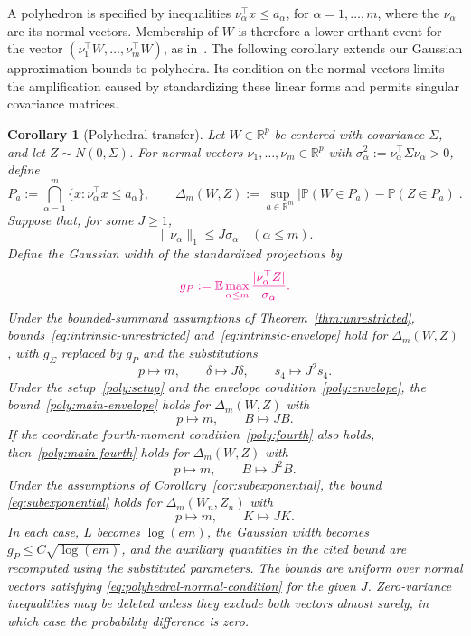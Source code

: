 \documentclass[11pt,letterpaper]{article}
\newenvironment{recovered}{}{}
\newcommand{\vSix}[1]{{\color{magenta}#1}}
\newtheorem{corollary}{Corollary}
\theoremstyle{remark}
\newcommand{\E}{\mathbb E}
\newcommand{\Pp}{\mathbb P}
\newcommand{\R}{\mathbb R}
\begin{document}
\begin{recovered}
A polyhedron is specified by inequalities
\(\nu_\alpha^\top x\le a_\alpha\), for \(\alpha=1,\ldots,m\),
where the \(\nu_\alpha\) are its normal vectors. Membership of
\(W\) is therefore a lower-orthant event for the vector
\((\nu_1^\top W,\ldots,\nu_m^\top W)\), as
in~\cite[Section~3.1]{CCK2017}.
The following corollary extends our Gaussian approximation bounds to
polyhedra. Its condition on the normal vectors limits the amplification
caused by standardizing these linear forms and permits singular
covariance matrices.
\end{recovered}

\begin{recovered}
\begin{corollary}[Polyhedral transfer]\label{cor:polyhedral-transfer}
Let \(W\in\R^p\) be centered with covariance \(\Sigma\), and let
\(Z\sim N(0,\Sigma)\). For normal vectors \(\nu_1,\ldots,\nu_m\in\R^p\)
with \(\sigma_\alpha^2:=\nu_\alpha^\top\Sigma\nu_\alpha>0\), define
\[
 P_a:=\bigcap_{\alpha=1}^m\{x:\nu_\alpha^\top x\le a_\alpha\},
 \qquad
 \Delta_m(W,Z):=\sup_{a\in\R^m}
 \bigl|\Pp(W\in P_a)-\Pp(Z\in P_a)\bigr|.
\]
Suppose that, for some \(J\ge1\),
\begin{equation}
 \|\nu_\alpha\|_1\le J\sigma_\alpha\quad(\alpha\le m).
 \label{eq:polyhedral-normal-condition}
\end{equation}
\vSix{Define the Gaussian width of the standardized projections by}
\[
 \vSix{g_P:=\E\max_{\alpha\le m}
                  \frac{|\nu_\alpha^\top Z|}{\sigma_\alpha}.}
\]
Under the bounded-summand assumptions of Theorem~\ref{thm:unrestricted},
\vSix{bounds~\eqref{eq:intrinsic-unrestricted} and~\eqref{eq:intrinsic-envelope}
hold for \(\Delta_m(W,Z)\), with \(g_\Sigma\) replaced by \(g_P\)
and the substitutions}
\[
 p\mapsto m,\qquad \delta\mapsto J\delta,\qquad s_4\mapsto J^2s_4.
\]
Under the setup~\eqref{poly:setup} and the envelope
condition~\eqref{poly:envelope}, the bound~\eqref{poly:main-envelope}
holds for \(\Delta_m(W,Z)\) with
\[
 p\mapsto m,\qquad B\mapsto JB.
\]
If the coordinate fourth-moment condition~\eqref{poly:fourth} also holds,
then~\eqref{poly:main-fourth} holds for \(\Delta_m(W,Z)\) with
\[
 p\mapsto m,\qquad B\mapsto J^2B.
\]
Under the assumptions of Corollary~\ref{cor:subexponential},
the bound \eqref{eq:subexponential} holds for \(\Delta_m(W_n,Z_n)\) with
\[
 p\mapsto m,\qquad K\mapsto JK.
\]
\vSix{In each case, \(L\) becomes \(\log(em)\), the Gaussian width
becomes \(g_P\le C\sqrt{\log(em)}\), and the auxiliary quantities
in the cited bound are recomputed using the substituted parameters.}
The bounds are uniform over normal vectors satisfying
\eqref{eq:polyhedral-normal-condition} for the given \(J\).
Zero-variance inequalities may be deleted unless they exclude both
vectors almost surely, in which case the probability difference is zero.
\end{corollary}
\end{recovered}
\end{document}
